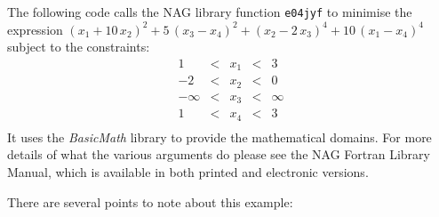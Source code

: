 The following code calls the NAG library function {\tt e04jyf}
to minimise the expression 
$(x_1+10\,x_2)^2+5\,(x_3-x_4)^2+(x_2-2\,x_3)^4+10\,(x_1-x_4)^4$
subject to the constraints:
$$
\begin{array}{rcccr}
1       &<& x_1 &<& 3 \\
-2      &<& x_2 &<& 0 \\
-\infty &<& x_3 &<& \infty \\
1       &<& x_4 &<& 3 \\
\end{array}
$$
It uses the {\em BasicMath} library to provide the mathematical
domains.
For more details of what
the various arguments do please see the NAG Fortran Library Manual,
which is available in both printed and electronic versions. 

There are several points to note about this example:
